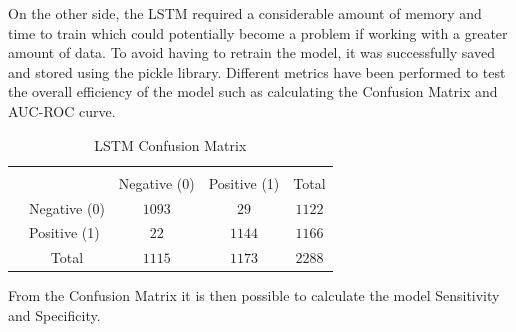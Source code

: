 On the other side, the LSTM required a considerable amount of memory and time to train which could potentially become a problem if working with a greater amount of data. To avoid having to retrain the model, it was successfully saved and stored using the pickle library. Different metrics have been performed to test the overall efficiency of the model such as calculating the Confusion Matrix and AUC-ROC curve.


{
\begin{table}[h!]
\centering
\begin{tabular}{l|l|c|c|c}
\multicolumn{2}{c}{}&\multicolumn{2}{c}{}&\\
\cline{3-4}
\multicolumn{2}{c|}{}&Negative (0)&Positive (1)&\multicolumn{1}{c}{Total}\\
\cline{2-4}
\multirow{}{}{}& Negative (0) & $1093$ & $29$ & $1122$\\
\cline{2-4}
& Positive (1) & $22$ & $1144$ & $1166$\\
\cline{2-4}
\multicolumn{1}{c}{} & \multicolumn{1}{c}{Total} & \multicolumn{1}{c}{$1115$} & \multicolumn{    1}{c}{$1173$} & \multicolumn{1}{c}{$2288$}\\
\end{tabular}
\caption{LSTM Confusion Matrix}
\label{table:1}
\end{table}
}


From the Confusion Matrix it is then possible to calculate the model Sensitivity and Specificity.

